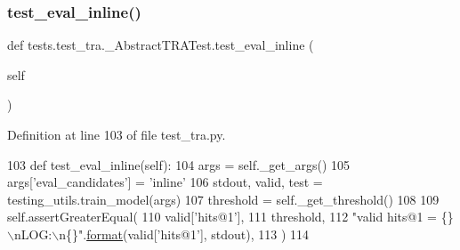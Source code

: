 \mbox{\label{classtests_1_1test__tra_1_1__AbstractTRATest_af0ce31577227b0572fb440881dd48be0}} 
\subsubsection{\texorpdfstring{test\+\_\+eval\+\_\+inline()}{test\_eval\_inline()}}
{\footnotesize\ttfamily def tests.\+test\+\_\+tra.\+\_\+\+Abstract\+T\+R\+A\+Test.\+test\+\_\+eval\+\_\+inline (\begin{DoxyParamCaption}\item[{}]{self }\end{DoxyParamCaption})}



Definition at line 103 of file test\+\_\+tra.\+py.


\begin{DoxyCode}
103     \textcolor{keyword}{def }test\_eval\_inline(self):
104         args = self.\_get\_args()
105         args[\textcolor{stringliteral}{'eval\_candidates'}] = \textcolor{stringliteral}{'inline'}
106         stdout, valid, test = testing\_utils.train\_model(args)
107         threshold = self.\_get\_threshold()
108 
109         self.assertGreaterEqual(
110             valid[\textcolor{stringliteral}{'hits@1'}],
111             threshold,
112             \textcolor{stringliteral}{"valid hits@1 = \{\}\(\backslash\)nLOG:\(\backslash\)n\{\}"}.\hyperlink{namespaceparlai_1_1chat__service_1_1services_1_1messenger_1_1shared__utils_a32e2e2022b824fbaf80c747160b52a76}{format}(valid[\textcolor{stringliteral}{'hits@1'}], stdout),
113         )
114 
\end{DoxyCode}
\mbox{\label{classtests_1_1test__tra_1_1__AbstractTRATest_a4576c8054384ac195a275851d2cd3e4f}} 
